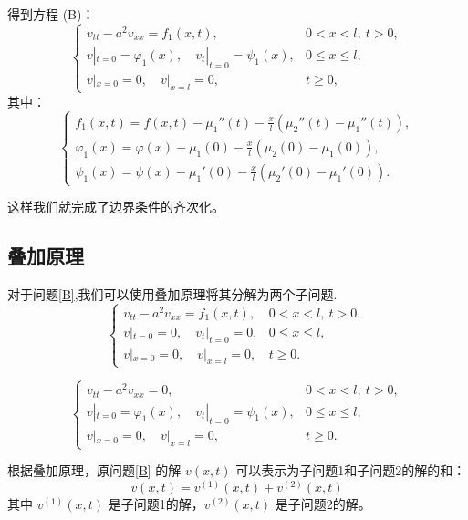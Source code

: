\documentclass[12pt,a4paper]{article}
\numberwithin{subsection}{section}   %
\numberwithin{subsubsection}{subsection}
\theoremstyle{plain}
\theoremstyle{definition}
\theoremstyle{remark}
\theoremstyle{remark}
\begin{document}
	得到方程 (B)：
	\begin{equation}\label{B}
		\begin{cases}
			v_{tt} - a^2 v_{xx} = f_1(x, t), & 0 < x < l, \ t > 0, \\
			v|_{t=0} = \varphi_1(x), \quad v_t|_{t=0} = \psi_1(x), & 0 \leq x \leq l, \\
			v|_{x=0} = 0, \quad v|_{x=l} = 0, & t \geq 0,
		\end{cases}
	\end{equation}
	其中：
	\begin{equation}
		\begin{cases}
			f_1(x, t) = f(x, t) - \mu_1''(t) - \frac{x}{l}(\mu_2''(t) - \mu_1''(t)), \\
			\varphi_1(x) = \varphi(x) - \mu_1(0) - \frac{x}{l}(\mu_2(0) - \mu_1(0)), \\
			\psi_1(x) = \psi(x) - \mu_1'(0) - \frac{x}{l}(\mu_2'(0) - \mu_1'(0)).
		\end{cases}
	\end{equation}
	
	这样我们就完成了边界条件的齐次化。
	
	\subsection{叠加原理}
	对于问题\eqref{B},我们可以使用叠加原理将其分解为两个子问题.
	\begin{equation}
		\begin{cases}
			v_{tt} - a^2 v_{xx} = f_1(x, t), & 0 < x < l, \ t > 0, \\
			v|_{t=0} = 0, \quad v_t|_{t=0} = 0, & 0 \leq x \leq l, \\
			v|_{x=0} = 0, \quad v|_{x=l} = 0, & t \geq 0.
		\end{cases}
	\end{equation}
	
	\begin{equation}\label{f}
		\begin{cases}
			v_{tt} - a^2 v_{xx} = 0, & 0 < x < l, \ t > 0, \\
			v|_{t=0} = \varphi_1(x), \quad v_t|_{t=0} = \psi_1(x), & 0 \leq x \leq l, \\
			v|_{x=0} = 0, \quad v|_{x=l} = 0, & t \geq 0.
		\end{cases}
	\end{equation}
	
	
	根据叠加原理，原问题\eqref{B}  的解 \(v(x, t)\) 可以表示为子问题1和子问题2的解的和：
	\begin{equation}
		v(x, t) = v^{(1)}(x, t) + v^{(2)}(x, t)
	\end{equation}
	其中 \(v^{(1)}(x, t)\) 是子问题1的解，\(v^{(2)}(x, t)\) 是子问题2的解。
	
\end{document}
